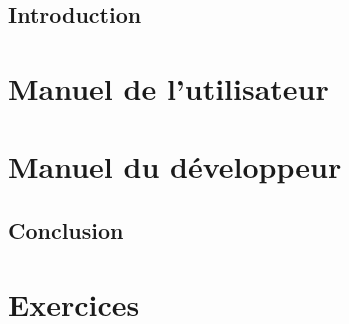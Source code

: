 \documentclass[11pt,fleqn,french]{book} %
\begin{document}

\pagestyle{empty} %

\renewcommand\contentsname{Table des Matières}
\renewcommand{\bibname}{Bibliographie}
\tableofcontents%


\pagestyle{fancy} %


\setlength\parindent{0ex}
\setlength\parskip{1ex}


\chapter{Introduction}


\part{Manuel de l'utilisateur}

\part{Manuel du développeur}



\chapter{Conclusion}


\part{Exercices}

\end{document}

